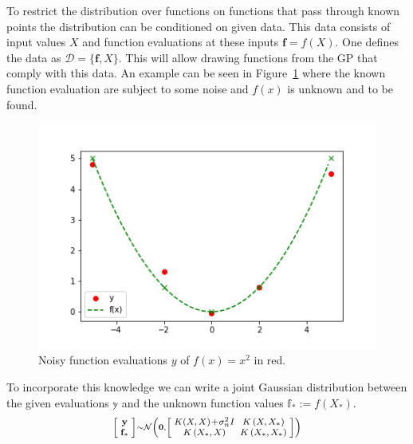     To restrict the distribution over functions on functions that pass through known points the distribution can be conditioned on given data. This data consists of input values $X$ and function evaluations at these inputs $\mathbf f = f(X)$. One defines the data as $\mathcal{D}= \{\mathbf f,X\}$. This will allow drawing functions from the GP that comply with this data. An example can be seen in Figure~\ref{f:explfunction} where the known function evaluation are subject to some noise and $f(x)$ is unknown and to be found.
    \begin{figure}[ht]
        \centering
        \includegraphics[width=.9\linewidth]{SoM_report_template/figures/function.png}
        \caption[Example function plot]{\label{f:explfunction}Noisy function evaluations $y$ of $f(x)=x^2$ in red.}
    \end{figure}
    To incorporate this knowledge we can write a joint Gaussian distribution between the given evaluations $\mathbb y$ and the unknown function values $\mathbb f_* := f(X_*)$. 
    \begin{equation} \begin{aligned}
    \label{eq:general_joint_gaussian}
        \footnotesize
        \setlength{\arraycolsep}{2.5pt}
        \medmuskip = 1mu %
        \scriptstyle
            \left[\begin{array}{c}
            \mathbf{y} \\
            \mathbf{f}_{*}
            \end{array}\right] \sim \mathcal{N}\left(\mathbf{0},\left[\begin{array}{cc}
            K(X, X)+\sigma_{n}^{2} I & K\left(X, X_{*}\right) \\
            K\left(X_{*}, X\right) & K\left(X_{*}, X_{*}\right)
            \end{array}\right]\right) \end{aligned}
    \end{equation}
